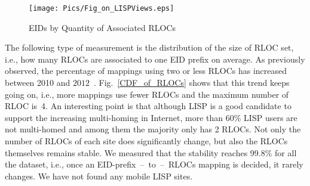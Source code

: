 \begin{figure}[ht]
        \centering
        \texttt{[image: Pics/Fig\_on\_LISPViews.eps]}
        \caption{EIDs by Quantity of Associated RLOCs~\cite{lispviews}}
        \label{Fig_on_LISPViews}
\end{figure}

The following type of measurement is the distribution of the size of RLOC set,
i.e., how many RLOCs are associated to one EID prefix on average. As
previously observed, the percentage of mappings using two or less RLOCs has
increased between 2010 and $2012$~\cite{lispCCR}. Fig.~\ref{CDF_of_RLOCs}
shows that this trend keeps going on, i.e., more mappings use fewer RLOCs and
the maximum number of RLOC is~4. An interesting point is that although LISP is a
good candidate to support the increasing multi-homing in Internet,
more than 60\% LISP users are not multi-homed and among them the majority
only has 2 RLOCs. Not only the number of RLOCs of each site does significantly
change, but also the RLOCs themselves remains stable. We measured that the
stability reaches 99.8\% for all the dataset, i.e., once an
EID-prefix~--~to~--~RLOCs mapping is decided, it rarely changes. We have not found any mobile LISP sites.

